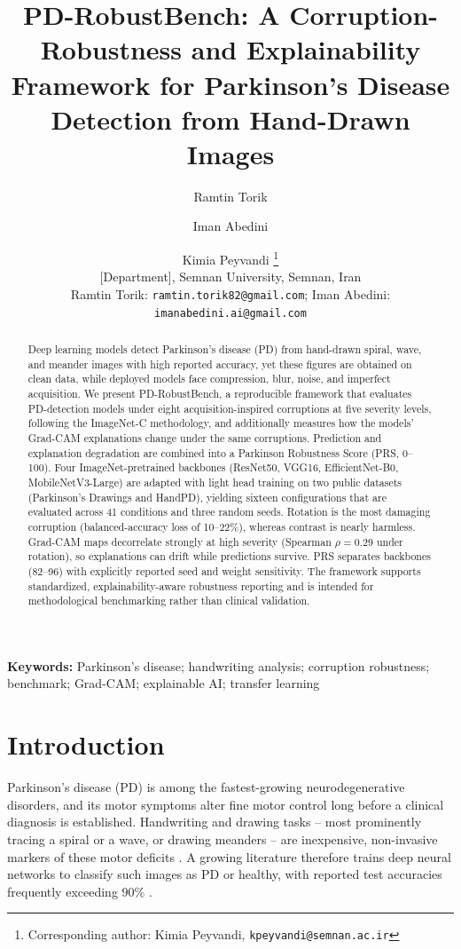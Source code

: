 \documentclass[11pt,a4paper]{article}
\title{\textbf{PD-RobustBench: A Corruption-Robustness and Explainability Framework for Parkinson's Disease Detection from Hand-Drawn Images}}
\author{Ramtin Torik \and Iman Abedini \and Kimia Peyvandi%
\thanks{Corresponding author: Kimia Peyvandi, \texttt{kpeyvandi@semnan.ac.ir}}\\[4pt]
\small [Department], Semnan University, Semnan, Iran\\
\small Ramtin Torik: \texttt{ramtin.torik82@gmail.com}; Iman Abedini: \texttt{imanabedini.ai@gmail.com}}
\date{}
\begin{document}
\maketitle

\begin{abstract}
Deep learning models detect Parkinson's disease (PD) from hand-drawn spiral,
wave, and meander images with high reported accuracy, yet these figures are
obtained on clean data, while deployed models face compression, blur, noise,
and imperfect acquisition. We present PD-RobustBench, a reproducible
framework that evaluates PD-detection models under eight acquisition-inspired
corruptions at five severity levels, following the ImageNet-C methodology,
and additionally measures how the models' Grad-CAM explanations change under
the same corruptions. Prediction and explanation degradation are combined
into a Parkinson Robustness Score (PRS, 0--100). Four ImageNet-pretrained
backbones (ResNet50, VGG16, EfficientNet-B0, MobileNetV3-Large) are adapted
with light head training on two public datasets (Parkinson's Drawings and
HandPD), yielding sixteen configurations that are evaluated across 41
conditions and three random seeds. Rotation is the most damaging corruption
(balanced-accuracy loss of 10--22\%), whereas contrast is nearly harmless.
Grad-CAM maps decorrelate strongly at high severity (Spearman $\rho=0.29$
under rotation), so explanations can drift while predictions survive. PRS
separates backbones (82--96) with explicitly reported seed and weight
sensitivity. The framework supports standardized, explainability-aware
robustness reporting and is intended for methodological benchmarking rather
than clinical validation.
\end{abstract}

\noindent\textbf{Keywords:} Parkinson's disease; handwriting analysis;
corruption robustness; benchmark; Grad-CAM; explainable AI; transfer learning

\section{Introduction}
Parkinson's disease (PD) is among the fastest-growing neurodegenerative
disorders, and its motor symptoms alter fine motor control long before a
clinical diagnosis is established. Handwriting and drawing tasks -- most
prominently tracing a spiral or a wave, or drawing meanders -- are inexpensive,
non-invasive markers of these motor deficits
\cite{zham2016,zham2017,pereira2016}. A growing literature therefore trains
deep neural networks to classify such images as PD or healthy, with reported
test accuracies frequently exceeding 90\%
\cite{huang2024,frontiers2024,aims2024,diagnostics2025}.
\end{document}

